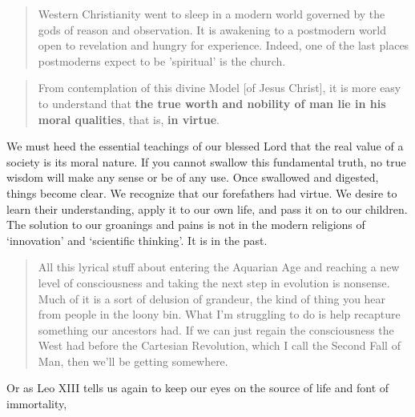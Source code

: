 \documentclass[letterpaper]{article}
\begin{document}
\begin{quote}
  Western Christianity went to sleep in a modern world governed by the gods of reason and observation. It is awakening to a postmodern world open to revelation and hungry for experience. Indeed, one of the last places postmoderns expect to be 'spiritual' is the church.
\end{quote}


\begin{quote}
  From contemplation of this divine Model [of Jesus Christ], it is more easy to understand that \textbf{the true worth and nobility of man lie in his moral qualities}, that is, \textbf{in virtue}.
\end{quote}

We must heed the essential teachings of our blessed Lord that the real value of a society is its moral nature. If you cannot swallow this fundamental truth, no true wisdom will make any sense or be of any use. Once swallowed and digested, things become clear. We recognize that our forefathers had virtue. We desire to learn their understanding, apply it to our own life, and pass it on to our children. The solution to our groanings and pains is not in the modern religions of `innovation' and `scientific thinking'. It is in the past.

\begin{quote}
  All this lyrical stuff about entering the Aquarian Age and reaching a new level of consciousness and taking the next step in evolution is nonsense. Much of it is a sort of delusion of grandeur, the kind of thing you hear from people in the loony bin. What I'm struggling to do is help recapture something our ancestors had. If we can just regain the consciousness the West had before the Cartesian Revolution, which I call the Second Fall of Man, then we'll be getting somewhere.

\end{quote}

Or as Leo XIII tells us again to keep our eyes on the source of life and font of immortality,
\end{document}
